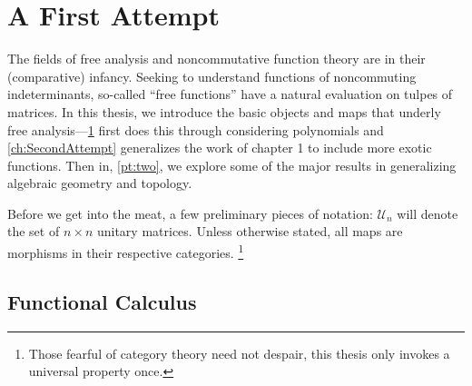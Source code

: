 \chapter{A First Attempt}\label{ch:FirstAttempt}

The fields of free analysis and noncommutative function theory are in their
(comparative) infancy. Seeking to understand functions of noncommuting
indeterminants, so-called ``free functions'' have a natural evaluation on
tulpes of matrices. In this thesis, we introduce the basic objects and maps that
underly free analysis---\cref{ch:FirstAttempt} first does this through
considering
polynomials and \cref{ch:SecondAttempt} generalizes the work
of chapter 1 to include more exotic functions. Then in, \cref{pt:two}, we explore
some of the major results in generalizing algebraic geometry and topology.


Before we get into the meat, a few preliminary pieces of notation:
 \(\mathcal{U}_n\) will denote the set of \(n\times n\) unitary matrices. Unless
otherwise stated, all maps are morphisms in their respective categories.
\footnote{Those fearful of category theory need not despair, this thesis only
  invokes a universal property once.}

\section{Functional Calculus}%
\label{sec:functionalcalc}

